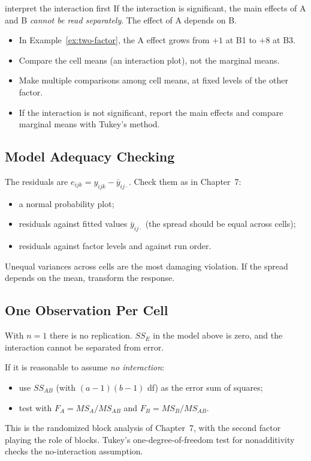 \begin{pitfall}{interpret the interaction first}
If the interaction is significant, the main effects of A and B \emph{cannot be read separately}. The effect of A depends on B.
\begin{itemize}
  \item In Example~\ref{ex:two-factor}, the A effect grows from $+1$ at B1 to $+8$ at B3.
  \item Compare the cell means (an interaction plot), not the marginal means.
  \item Make multiple comparisons among cell means, at fixed levels of the other factor.
  \item If the interaction is not significant, report the main effects and compare marginal means with Tukey's method.
\end{itemize}
\end{pitfall}

\subsection{Model Adequacy Checking}

The residuals are $e_{ijk}=y_{ijk}-\bar{y}_{ij\cdot}$. Check them as in Chapter~7:
\begin{itemize}
  \item a normal probability plot;
  \item residuals against fitted values $\bar{y}_{ij\cdot}$ (the spread should be equal across cells);
  \item residuals against factor levels and against run order.
\end{itemize}
Unequal variances across cells are the most damaging violation. If the spread depends on the mean, transform the response.

\subsection{One Observation Per Cell}

With $n=1$ there is no replication. $SS_E$ in the model above is zero, and the interaction cannot be separated from error.

If it is reasonable to assume \emph{no interaction}:
\begin{itemize}
  \item use $SS_{AB}$ (with $(a-1)(b-1)$ df) as the error sum of squares;
  \item test with $F_A=MS_A/MS_{AB}$ and $F_B=MS_B/MS_{AB}$.
\end{itemize}
This is the randomized block analysis of Chapter~7, with the second factor playing the role of blocks. Tukey's one-degree-of-freedom test for nonadditivity checks the no-interaction assumption.


